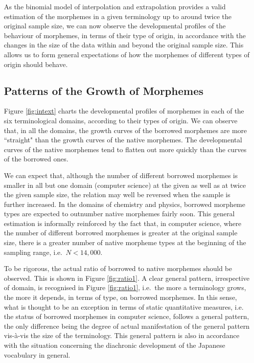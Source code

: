 As the binomial model of interpolation and extrapolation provides a valid
estimation of the morphemes in a given terminology up to around twice the original
sample size, we can now observe the developmental profiles of the behaviour
of morphemes, in terms of their type of origin, in accordance with the
changes in the size of the data within and beyond the original sample size. 
This allows us to form general expectations of how the morphemes of different 
types of origin should behave.


\subsection{Patterns of the Growth of Morphemes}

Figure \ref{fig:intext} charts the developmental profiles of morphemes 
in each of the six terminological domains, according to their types of 
origin. We can observe that, in all the domains, the growth
curves of the borrowed morphemes are more ``straight" than the growth
curves of the native morphemes. The developmental curves of the native
morphemes tend to flatten out more quickly than the curves of the
borrowed ones.

We can expect that, although the number of different borrowed morphemes
is smaller in all but one domain (computer science) at the given as well as
at twice the given sample size, the relation may well be reversed
when the sample is further increased. In the domains of chemistry and physics,
borrowed morpheme types are expected to outnumber native morphemes fairly soon. 
This general estimation is informally reinforced by the fact that, in computer 
science, where the number
of different borrowed morphemes is greater at the original sample size,
there is a greater number of native morpheme types at the beginning of
the sampling range, i.e.\ $N < 14,000$.

\begin{figure*}[t]
\begin{center}
\leavevmode
{}
\end{center}
\caption{Growth of morphemes based on binomial interpolation and extrapolation}
\label{fig:intext}
\end{figure*}

To be rigorous, the actual ratio of borrowed
to native morphemes should be observed. This is shown in Figure \ref{fig:ratio1}.
A clear general pattern, irrespective of domain, is recognised in Figure
\ref{fig:ratio1}, i.e.\ the more a terminology grows, the more it depends, in terms
of type, on borrowed morphemes. In this sense, what is thought to be an exception
in terms of static quantitative measures, i.e. the status of borrowed morphemes in
computer science, follows a general pattern, the only difference being the
degree of actual manifestation of the general pattern vis-\`a-vis the size of
the terminology. This general pattern is also in accordance with the situation
concerning the diachronic development of the Japanese vocabulary in general.

